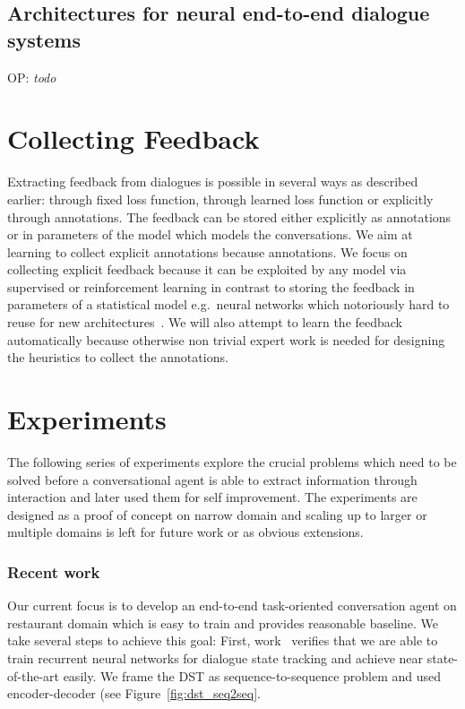 \documentclass[11pt]{article}
\def\OP#1{{\color{purple}OP: \it #1}}
\begin{document}
\subsection{Architectures for neural end-to-end dialogue systems}
\label{sub:nn_architectures}
\OP{todo}


\section{Collecting Feedback}
\label{sec:learn_feedback}
Extracting feedback from dialogues is possible in several ways as described earlier: through fixed loss function, through learned loss function or explicitly through annotations.
The feedback can be stored either explicitly as annotations or in parameters of the model which models the conversations.
We aim at learning to collect explicit annotations because annotations.
We focus on collecting explicit feedback because it can be exploited by any model via supervised or reinforcement learning in contrast to storing the feedback in parameters of a statistical model e.g.\ neural networks which notoriously hard to reuse for new architectures~\cite{oquab_learning_2014}.
We will also attempt to learn the feedback automatically because otherwise non trivial expert work is needed for designing the heuristics to collect the annotations.

\section{Experiments}
\label{sec:experiments}
The following series of experiments explore the crucial problems which need to be solved before a conversational agent is able to extract information through interaction and later used them for self improvement.
The experiments are designed as a proof of concept on narrow domain and scaling up to larger or multiple domains is left for future work or as obvious extensions. 

\subsubsection*{Recent work}
Our current focus is to develop an end-to-end task-oriented conversation agent on restaurant domain which is easy to train and provides reasonable baseline.
We take several steps to achieve this goal:
First, work~\cite{platek_recurrent_2016} verifies that we are able to train recurrent neural networks for dialogue state tracking and achieve near state-of-the-art easily. 
We frame the DST as sequence-to-sequence problem and used encoder-decoder (see Figure~\ref{fig:dst_seq2seq}. 
\end{document}
